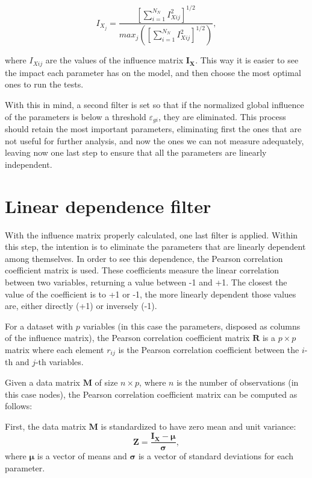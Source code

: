 \begin{equation}I_{X_j}=\frac{\left[\sum_{i=1}^{N_N}I_{Xij}^2\right]^{1/2}}{max_j\left(\left[\sum_{i=1}^{N_N}I_{Xij}^2\right]^{1/2}\right)},\end{equation}

where $I_{Xij}$ are the values of the influence matrix $\boldsymbol{I_X}$. This way it is easier to see the impact each parameter has on the model, and then choose the most optimal ones to run the tests.

With this in mind, a second filter is set so that if the normalized global influence of the parameters is below a threshold $\varepsilon_{gi}$, they are eliminated.
This process should retain the most important parameters, eliminating first the ones that are not useful for further analysis, and now the ones we can not measure adequately, leaving now one last step to ensure that all the parameters are linearly independent.

\section{Linear dependence filter}\label{s:ldfilter}
With the influence matrix properly calculated, one last filter is applied. Within this step, the intention is to eliminate the parameters that are linearly dependent among themselves. In order to see this dependence, the Pearson correlation coefficient matrix is used. These coefficients measure the linear correlation between two variables, returning a value between -1 and +1. The closest the value of the coefficient is to +1 or -1, the more linearly dependent those values are, either directly (+1) or inversely (-1).

For a dataset with \( p \) variables (in this case the parameters, disposed as columns of the influence matrix), the Pearson correlation coefficient matrix \( \mathbf{R} \) is a \( p \times p \) matrix where each element \( r_{ij} \) is the Pearson correlation coefficient between the \( i \)-th and \( j \)-th variables.

Given a data matrix \( \mathbf{M} \) of size \( n \times p \), where \( n \) is the number of observations (in this case nodes), the Pearson correlation coefficient matrix can be computed as follows:

First, the data matrix \( \mathbf{M} \) is standardized to have zero mean and unit variance:
   \[
   \mathbf{Z} = \frac{\boldsymbol{I_X} - \mathbf{\mu}}{\mathbf{\sigma}},
   \]
where \( \mathbf{\mu} \) is a vector of means and \( \mathbf{\sigma} \) is a vector of standard deviations for each parameter.

